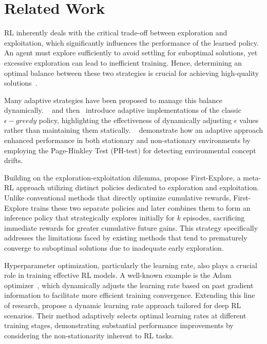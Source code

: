 
\section{Related Work}
\label{sec:related}

\ac{RL} inherently deals with the critical trade-off between exploration and exploitation, which 
significantly influences the performance of the learned policy. An agent must explore sufficiently to 
avoid settling for suboptimal solutions, yet excessive exploration can lead to inefficient training. 
Hence, determining an optimal balance between these two strategies is crucial for achieving 
high-quality solutions~\cite{sutton98}.

Many adaptive strategies have been proposed to manage this balance dynamically. ~\citet{tokic2010} 
and then~\citet{mignon2017adaptive} introduce adaptive implementations of the classic 
$\epsilon-greedy$ policy, highlighting the effectiveness of dynamically adjusting $\epsilon$ values 
rather than maintaining them statically. ~\citet{mignon2017adaptive} demonstrate how an adaptive 
approach enhanced performance in both stationary and non-stationary environments by employing 
the Page-Hinkley Test (PH-test) for detecting environmental concept drifts.

Building on the exploration-exploitation dilemma, \citet{norman2024firstexploreexploitmetalearningsolve} 
propose First-Explore, a meta-\ac{RL} approach utilizing distinct policies dedicated to exploration 
and exploitation. Unlike conventional methods that directly optimize cumulative rewards, First-Explore 
trains these two separate policies and later combines them to form an inference policy that strategically 
explores initially for $k$ episodes, sacrificing immediate rewards for greater cumulative future gains. 
This strategy specifically addresses the limitations faced by existing methods that tend to prematurely 
converge to suboptimal solutions due to inadequate early exploration.

Hyperparameter optimization, particularly the learning rate, also plays a crucial role in training 
effective \ac{RL} models. A well-known example is the Adam 
optimizer~\cite{kingma2017adammethodstochasticoptimization}, which dynamically adjusts the learning 
rate based on past gradient information to facilitate more efficient training convergence. Extending 
this line of research, \citet{dynamicrlalpha} propose a dynamic learning rate approach tailored for deep 
\ac{RL} scenarios. Their method adaptively selects optimal learning rates at different training stages, 
demonstrating substantial performance improvements by considering the non-stationarity inherent to 
\ac{RL} tasks.

